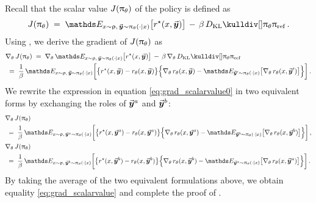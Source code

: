 		Recall that the scalar value $J(\uppi_{\theta})$ of the policy is defined as
		\begin{align*}
			\scalarvalue(\policytheta) \; = \;
			\Exp_{\prompt \sim \promptdistr, \, \response \sim \policytheta(\cdot \mid \prompt)} \big[ \rewardstar(\context, \response) \big] \, - \,
			\parabeta \, \kull{\policytheta}{\policyref} \, .
		\end{align*}
		Using , we derive the gradient of $J(\uppi_{\theta})$ as
		\begin{align}
			& \gradtheta \scalarvalue(\policytheta) \; = \; \gradtheta \Exp_{\prompt \sim \promptdistr, \, \response \sim \policytheta(\cdot \mid \prompt)} \big[ \rewardstar(\context, \response) \big] \, - \,
			\parabeta \, \gradtheta \kull{\policytheta}{\policyref}  \notag  \\
			\label{eq:grad_scalarvalue0}
			& \; = \; \frac{1}{\parabeta} \, \Exp_{\prompt \sim \promptdistr, \,  \response \sim \policytheta(\cdot \mid \prompt)}
			\bigg[ \big\{ \rewardstar(\prompt, \response) - \rewardtheta(\prompt, \response) \big\}
			\Big\{ \gradtheta \rewardtheta(\prompt, \response) - \Exp_{\responsenew \sim \policytheta(\cdot \mid \prompt)}\big[ \gradtheta \rewardtheta(\prompt, \responsenew) \big] \Big\} \bigg] \, .
		\end{align}
		We rewrite the expression in equation \eqref{eq:grad_scalarvalue0} in two equivalent forms by exchanging the roles of $\vec{\boldsymbol{y}}\!\,^a$ and $\vec{\boldsymbol{y}}\!\,^b$:
		\begin{subequations}
		\begin{align}
			& \gradtheta \scalarvalue(\policytheta) \notag \\ 
			\label{eq:grad_scalarvalue1}
			& \; = \; \frac{1}{\parabeta} \, \Exp_{\prompt \sim \promptdistr, \,  \responseone \sim \policytheta(\cdot \mid \prompt)}
			\bigg[ \big\{ \rewardstar(\prompt, \responseone) - \rewardtheta(\prompt, \responseone) \big\} \Big\{ \gradtheta \rewardtheta(\prompt, \responseone) - \Exp_{\responsetwo \sim \policytheta(\cdot \mid \prompt)}\big[ \gradtheta \rewardtheta(\prompt, \responsetwo) \big] \Big\} \bigg] \, ,  \\
			& \gradtheta \scalarvalue(\policytheta) \notag \\ 
			\label{eq:grad_scalarvalue2}
			& \; = \; \frac{1}{\parabeta} \, \Exp_{\prompt \sim \promptdistr, \,  \responsetwo \sim \policytheta(\cdot \mid \prompt)}
			\bigg[ \big\{ \rewardstar(\prompt, \responsetwo) - \rewardtheta(\prompt, \responsetwo) \big\} \Big\{ \gradtheta \rewardtheta(\prompt, \responsetwo) - \Exp_{\responseone \sim \policytheta(\cdot \mid \prompt)}\big[ \gradtheta \rewardtheta(\prompt, \responseone) \big] \Big\} \bigg] \, .
		\end{align}
		\end{subequations}
		By taking the average of the two equivalent formulations above, we obtain equality \eqref{eq:grad_scalarvalue} and complete the proof of .  \\
		
